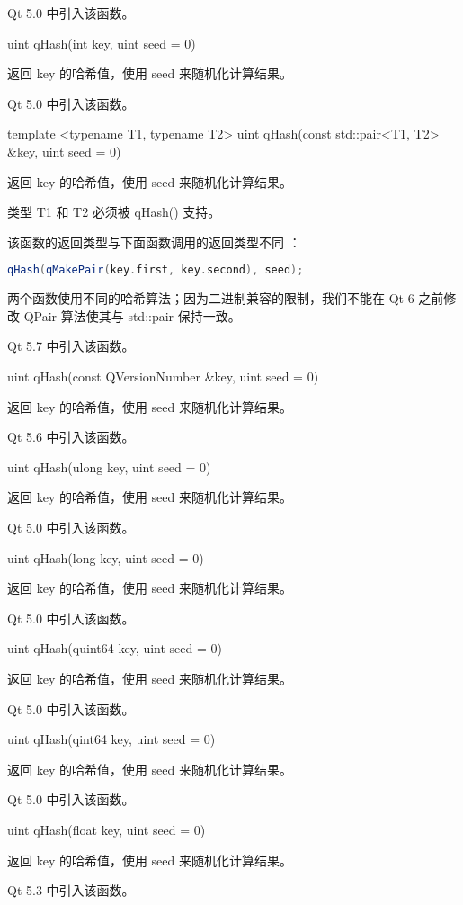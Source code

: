 Qt 5.0 中引入该函数。

uint qHash(int key, uint seed = 0)

返回 key 的哈希值，使用 seed 来随机化计算结果。

Qt 5.0 中引入该函数。

template <typename T1, typename T2> uint qHash(const std::pair<T1, T2> \&key, uint seed = 0)

返回 key 的哈希值，使用 seed 来随机化计算结果。

类型 T1 和 T2 必须被 qHash() 支持。

\begin{notice}
该函数的返回类型与下面函数调用的返回类型不同 ：
\end{notice}

\begin{lstlisting}[language=C++]
qHash(qMakePair(key.first, key.second), seed);
\end{lstlisting}

两个函数使用不同的哈希算法；因为二进制兼容的限制，我们不能在 Qt 6 之前修改 QPair 算法使其与 std::pair 保持一致。

Qt 5.7 中引入该函数。

uint qHash(const QVersionNumber \&key, uint seed = 0)

返回 key 的哈希值，使用 seed 来随机化计算结果。

Qt 5.6 中引入该函数。

uint qHash(ulong key, uint seed = 0)

返回 key 的哈希值，使用 seed 来随机化计算结果。

Qt 5.0 中引入该函数。

uint qHash(long key, uint seed = 0)

返回 key 的哈希值，使用 seed 来随机化计算结果。

Qt 5.0 中引入该函数。

uint qHash(quint64 key, uint seed = 0)

返回 key 的哈希值，使用 seed 来随机化计算结果。

Qt 5.0 中引入该函数。

uint qHash(qint64 key, uint seed = 0)

返回 key 的哈希值，使用 seed 来随机化计算结果。

Qt 5.0 中引入该函数。

uint qHash(float key, uint seed = 0)

返回 key 的哈希值，使用 seed 来随机化计算结果。

Qt 5.3 中引入该函数。

